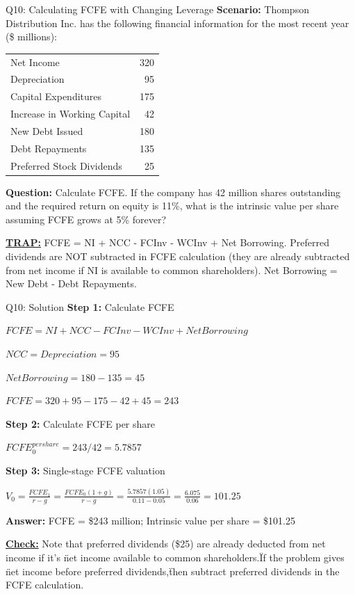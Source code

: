 \documentclass{beamer}
\renewcommand{\scriptsize}{\fontsize{6pt}{7pt}\selectfont}
\begin{document}
	\begin{frame}{Q10: Calculating FCFE with Changing Leverage}
		\scriptsize
		\textbf{Scenario:} Thompson Distribution Inc. has the following financial information for the most recent year (\$ millions):
		
		\begin{tabular}{lr}
			Net Income & 320 \\
			Depreciation & 95 \\
			Capital Expenditures & 175 \\
			Increase in Working Capital & 42 \\
			New Debt Issued & 180 \\
			Debt Repayments & 135 \\
			Preferred Stock Dividends & 25 \\
		\end{tabular}
		
		\textbf{Question:} Calculate FCFE. If the company has 42 million shares outstanding and the required return on equity is 11\%, what is the intrinsic value per share assuming FCFE grows at 5\% forever?
		
		\vspace{2pt}
		\underline{\textbf{TRAP:}} FCFE = NI + NCC - FCInv - WCInv + Net Borrowing. Preferred dividends are NOT subtracted in FCFE calculation (they are already subtracted from net income if NI is available to common shareholders). Net Borrowing = New Debt - Debt Repayments.
	\end{frame}
	
	\begin{frame}{Q10: Solution}
		\scriptsize
		\textbf{Step 1:} Calculate FCFE
		
		$FCFE = NI + NCC - FCInv - WCInv + Net Borrowing$
		
		$NCC = Depreciation = 95$
		
		$Net Borrowing = 180 - 135 = 45$
		
		$FCFE = 320 + 95 - 175 - 42 + 45 = 243$
		
		\vspace{2pt}
		\textbf{Step 2:} Calculate FCFE per share
		
		$FCFE_{0}^{per share} = 243/42 = 5.7857$
		
		\vspace{2pt}
		\textbf{Step 3:} Single-stage FCFE valuation
		
		$V_0 = \frac{FCFE_1}{r-g} = \frac{FCFE_0(1+g)}{r-g} = \frac{5.7857(1.05)}{0.11-0.05} = \frac{6.075}{0.06} = 101.25$
		
		\vspace{2pt}
		\textbf{Answer:} FCFE = \$243 million; Intrinsic value per share = \$101.25
		
		\vspace{2pt}
		\underline{\textbf{Check:}} Note that preferred dividends (\$25) are already deducted from net income if it's \"net income available to common shareholders.\" If the problem gives \"net income before preferred dividends,\" then subtract preferred dividends in the FCFE calculation.
	\end{frame}
	
\end{document}
